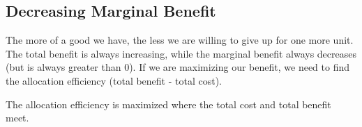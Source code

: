 \documentclass{article}
\begin{document}
\subsection{Decreasing Marginal Benefit}
The more of a good we have, the less we are willing to give up for one more
unit. The total benefit is always increasing, while the marginal benefit always
decreases (but is always greater than 0). If we are maximizing our benefit,
we need to find the allocation efficiency (total benefit - total cost).
\begin{center}
\end{center}
The allocation efficiency is maximized where the total cost and total benefit
meet.
\end{document}
